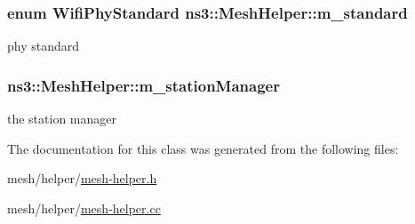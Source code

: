 \subsubsection[{\texorpdfstring{m\+\_\+standard}{m_standard}}]{\setlength{\rightskip}{0pt plus 5cm}enum {\bf Wifi\+Phy\+Standard} ns3\+::\+Mesh\+Helper\+::m\+\_\+standard\hspace{0.3cm}{\ttfamily [private]}}\hypertarget{classns3_1_1MeshHelper_a9bd5a76c7e1154f5d6aabc05323256d6}{}\label{classns3_1_1MeshHelper_a9bd5a76c7e1154f5d6aabc05323256d6}


phy standard 

\subsubsection[{\texorpdfstring{m\+\_\+station\+Manager}{m_stationManager}}]{ ns3\+::\+Mesh\+Helper\+::m\+\_\+station\+Manager\hspace{0.3cm}{\ttfamily [private]}}\hypertarget{classns3_1_1MeshHelper_a453a84d2cc5cbe9780273b247cae5190}{}\label{classns3_1_1MeshHelper_a453a84d2cc5cbe9780273b247cae5190}


the station manager 



The documentation for this class was generated from the following files\+:\begin{DoxyCompactItemize}
\item 
mesh/helper/\hyperlink{mesh-helper_8h}{mesh-\/helper.\+h}\item 
mesh/helper/\hyperlink{mesh-helper_8cc}{mesh-\/helper.\+cc}\end{DoxyCompactItemize}
